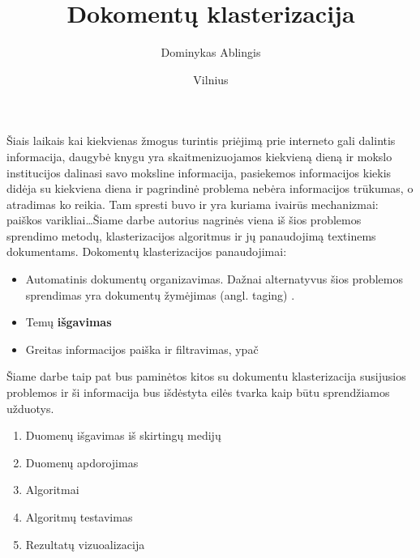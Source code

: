 \documentclass{VUMIFInfKursinis}
\title{Dokomentų klasterizacija}
\author{Dominykas Ablingis}
\date{Vilnius \\ \the\year}
\begin{document}

\newcommand{\LTandENG}[2]{#1 (angl. #2) }
\maketitle

\tableofcontents



Šiais laikais kai kiekvienas žmogus turintis priėjimą prie interneto gali dalintis informacija, daugybė knygu yra skaitmenizuojamos kiekvieną dieną ir mokslo institucijos dalinasi savo moksline informacija, pasiekemos informacijos kiekis didėja su kiekviena diena ir pagrindinė problema nebėra informacijos trūkumas, o atradimas ko reikia. Tam spresti buvo ir yra kuriama ivairūs mechanizmai: paiškos varikliai\ldots Šiame darbe autorius nagrinės viena iš šios problemos sprendimo metodų, klasterizacijos algoritmus ir jų panaudojimą textinems dokumentams. %
Dokomentų klasterizacijos panaudojimai:
\begin{itemize}
	\item Automatinis dokumentų organizavimas. Dažnai alternatyvus šios problemos sprendimas yra dokumentų \LTandENG{žymėjimas}{taging}.
	\item Temų \textbf{išgavimas}
	\item Greitas informacijos paiška ir filtravimas, ypač
\end{itemize}
Šiame darbe taip pat bus paminėtos kitos su dokumentu klasterizacija susijusios problemos ir ši informacija bus išdėstyta eilės tvarka kaip būtu sprendžiamos užduotys.
\begin{enumerate}
	\item Duomenų išgavimas iš skirtingų medijų
	\item Duomenų apdorojimas
	\item Algoritmai
	\item Algoritmų testavimas
	\item Rezultatų vizuoalizacija
\end{enumerate}
\end{document}
